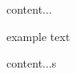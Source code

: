\documentclass{beamer}
\begin{document}
\begin{frame}
content...
\end{frame}

\begin{frame}[hide] %

example text

\end{frame}



\begin{frame}
content...s
\end{frame}
\end{document}
